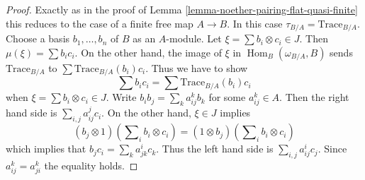 \documentclass[10pt,a4paper]{amsart}
\theoremstyle{plain}
\theoremstyle{definition}
\theoremstyle{remark}
\numberwithin{equation}{subsection}
\def\Hom{\mathop{\mathrm{Hom}}\nolimits}
\begin{document}
\begin{proof}
Exactly as in the proof of Lemma \ref{lemma-noether-pairing-flat-quasi-finite}
this reduces to the case of a finite free map $A \to B$.
In this case $\tau_{B/A} = \text{Trace}_{B/A}$.
Choose a basis $b_1, \ldots, b_n$ of $B$ as an $A$-module.
Let $\xi = \sum b_i \otimes c_i \in J$. Then $\mu(\xi) = \sum b_i c_i$.
On the other hand, the image of $\xi$ in $\Hom_B(\omega_{B/A}, B)$
sends $\text{Trace}_{B/A}$ to $\sum \text{Trace}_{B/A}(b_i)c_i$.
Thus we have to show
$$
\sum b_ic_i = \sum \text{Trace}_{B/A}(b_i)c_i
$$
when $\xi = \sum b_i \otimes c_i \in J$. Write $b_i b_j = \sum_k a_{ij}^k b_k$
for some $a_{ij}^k \in A$. Then the right hand side is
$\sum_{i, j} a_{ij}^j c_i$. On the other hand, $\xi \in J$ implies
$$
(b_j \otimes 1)(\sum\nolimits_i b_i \otimes c_i) =
(1 \otimes b_j)(\sum\nolimits_i b_i \otimes c_i)
$$
which implies that $b_j c_i = \sum_k a_{jk}^i c_k$. Thus the left hand side
is $\sum_{i, j} a_{ij}^i c_j$. Since $a_{ij}^k = a_{ji}^k$ the equality holds.
\end{proof}
\end{document}
